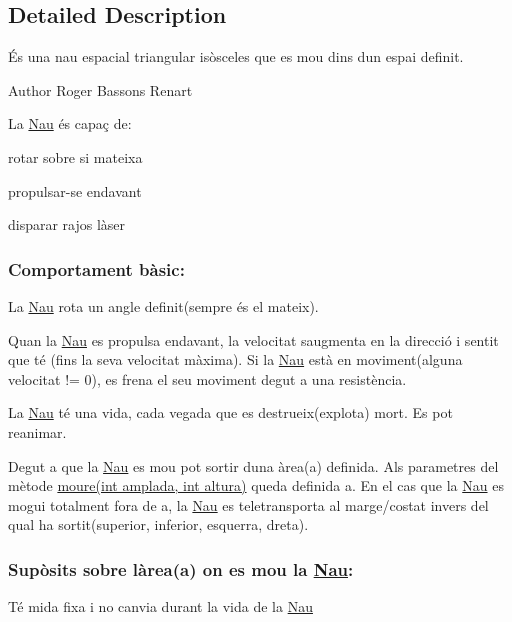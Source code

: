 \subsection{Detailed Description}
És una nau espacial triangular isòsceles que es mou dins d\textquotesingle{}un espai definit. 

\begin{DoxyAuthor}{Author}
Roger Bassons Renart
\end{DoxyAuthor}
La \hyperlink{class_nau}{Nau} és capaç de\+:
\begin{DoxyItemize}
\item rotar sobre si mateixa
\item propulsar-\/se endavant
\item disparar rajos làser
\end{DoxyItemize}

\subsubsection*{Comportament bàsic\+: }

La \hyperlink{class_nau}{Nau} rota un angle definit(sempre és el mateix).

Quan la \hyperlink{class_nau}{Nau} es propulsa endavant, la velocitat s\textquotesingle{}augmenta en la direcció i sentit que té (fins la seva velocitat màxima). Si la \hyperlink{class_nau}{Nau} està en moviment(alguna velocitat != 0), es frena el seu moviment degut a una resistència.

La \hyperlink{class_nau}{Nau} té una vida, cada vegada que es destrueix(explota) mort. Es pot reanimar.

Degut a que la \hyperlink{class_nau}{Nau} es mou pot sortir d\textquotesingle{}una àrea(a) definida. Als parametres del mètode \hyperlink{class_nau_a8dc46f91e02910b92bfad9b798f6552c}{moure(int amplada, int altura)} queda definida a. En el cas que la \hyperlink{class_nau}{Nau} es mogui totalment fora de a, la \hyperlink{class_nau}{Nau} es teletransporta al marge/costat invers del qual ha sortit(superior, inferior, esquerra, dreta).

\subsubsection*{Supòsits sobre l\textquotesingle{}àrea(a) on es mou la \hyperlink{class_nau}{Nau}\+: }

Té mida fixa i no canvia durant la vida de la \hyperlink{class_nau}{Nau}

